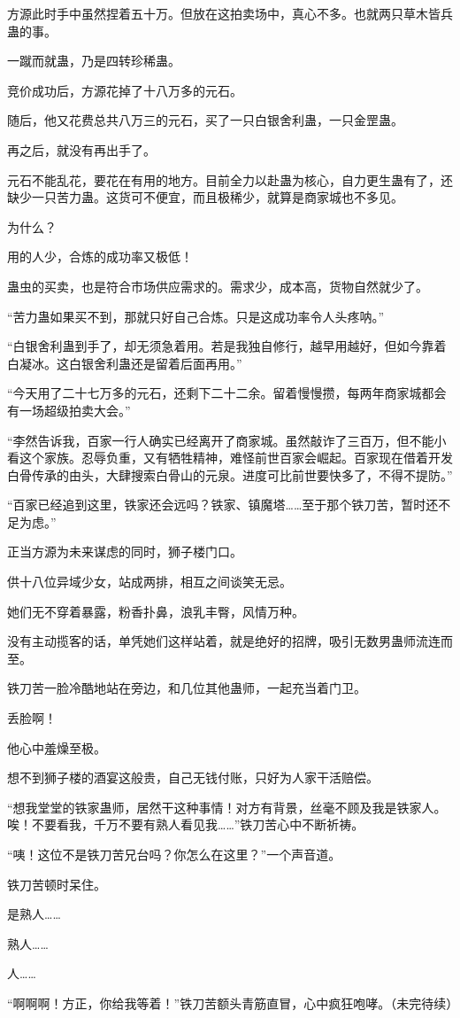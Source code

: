 \begin{this_body}
方源此时手中虽然捏着五十万。但放在这拍卖场中，真心不多。也就两只草木皆兵蛊的事。

一蹴而就蛊，乃是四转珍稀蛊。

竞价成功后，方源花掉了十八万多的元石。

随后，他又花费总共八万三的元石，买了一只白银舍利蛊，一只金罡蛊。

再之后，就没有再出手了。

元石不能乱花，要花在有用的地方。目前全力以赴蛊为核心，自力更生蛊有了，还缺少一只苦力蛊。这货可不便宜，而且极稀少，就算是商家城也不多见。

为什么？

用的人少，合炼的成功率又极低！

蛊虫的买卖，也是符合市场供应需求的。需求少，成本高，货物自然就少了。

“苦力蛊如果买不到，那就只好自己合炼。只是这成功率令人头疼呐。”

“白银舍利蛊到手了，却无须急着用。若是我独自修行，越早用越好，但如今靠着白凝冰。这白银舍利蛊还是留着后面再用。”

“今天用了二十七万多的元石，还剩下二十二余。留着慢慢攒，每两年商家城都会有一场超级拍卖大会。”

“李然告诉我，百家一行人确实已经离开了商家城。虽然敲诈了三百万，但不能小看这个家族。忍辱负重，又有牺牲精神，难怪前世百家会崛起。百家现在借着开发白骨传承的由头，大肆搜索白骨山的元泉。进度可比前世要快多了，不得不提防。”

“百家已经追到这里，铁家还会远吗？铁家、镇魔塔……至于那个铁刀苦，暂时还不足为虑。”

正当方源为未来谋虑的同时，狮子楼门口。

供十八位异域少女，站成两排，相互之间谈笑无忌。

她们无不穿着暴露，粉香扑鼻，浪乳丰臀，风情万种。

没有主动揽客的话，单凭她们这样站着，就是绝好的招牌，吸引无数男蛊师流连而至。

铁刀苦一脸冷酷地站在旁边，和几位其他蛊师，一起充当着门卫。

丢脸啊！

他心中羞燥至极。

想不到狮子楼的酒宴这般贵，自己无钱付账，只好为人家干活赔偿。

“想我堂堂的铁家蛊师，居然干这种事情！对方有背景，丝毫不顾及我是铁家人。唉！不要看我，千万不要有熟人看见我……”铁刀苦心中不断祈祷。

“咦！这位不是铁刀苦兄台吗？你怎么在这里？”一个声音道。

铁刀苦顿时呆住。

是熟人……

熟人……

人……

“啊啊啊！方正，你给我等着！”铁刀苦额头青筋直冒，心中疯狂咆哮。（未完待续）

\end{this_body}

